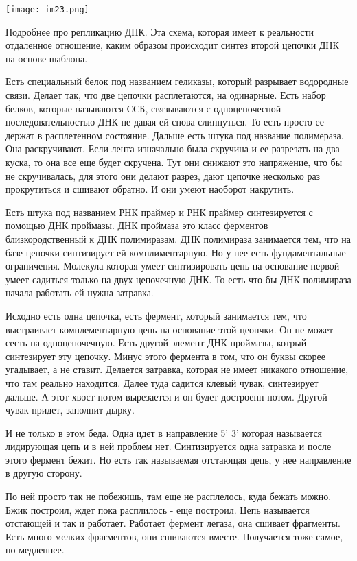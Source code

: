 \texttt{[image: im23.png]}

Подробнее про репликацию ДНК. Эта схема, которая имеет к реальности 
отдаленное отношение, каким образом происходит синтез второй цепочки ДНК на 
основе шаблона. 

Есть специальный белок под названием геликазы, который разрывает водородные связи. 
Делает так, что две цепочки расплетаются, на одинарные. Есть набор 
белков, которые называются ССБ, связываются с одноцепочесной последовательностью ДНК
не давая ей снова слипнуться. То есть просто ее держат в расплетенном состояние. 
Дальше есть штука под название полимераза.  Она раскручивают. Если лента изначально была 
скручина и ее разрезать на два куска, то она все еще будет скручена. Тут они снижают это 
напряжение, что бы не скручивалась, для этого они делают разрез, дают 
цепочке несколько раз прокрутиться и сшивают обратно. И они 
умеют наоборот накрутить. 

Есть штука под названием РНК праймер и РНК праймер синтезируется с помощью
ДНК проймазы. ДНК проймаза это класс ферментов близкородственный к ДНК 
полимиразам. ДНК полимираза занимается тем, что на базе 
цепочки синтизирует ей комплиментарную. Но у нее есть фундаментальные ограничения. 
Молекула которая умеет синтизировать цепь на основание первой умеет садиться 
только на двух цепочечную ДНК. То есть что бы ДНК полимираза начала работать 
ей нужна затравка. 

Исходно есть одна цепочка, есть фермент, который занимается тем, что выстраивает 
комплементарную цепь на основание этой цеопчки. Он не может 
сесть на одноцепочечную. Есть другой элемент ДНК проймазы, котрый 
синтезирует эту цепочку. Минус этого 
фермента в том, что он буквы скорее угадывает, а не ставит. Делается 
затравка, которая не имеет никакого отношение, что там реально находится. 
Далее туда садится клевый чувак, синтезирует дальше. А этот хвост потом вырезается и он 
будет достроенн потом. Другой чувак придет, заполнит дырку. 

И не только в этом беда. Одна идет в направление 5' 3' которая называется лидирующая цепь и 
в ней проблем нет. Синтизируется одна затравка и после этого 
фермент бежит. Но есть так называемая отстающая цепь, у нее направление в другую сторону. 

По ней просто так не побежишь, там еще не расплелось, куда бежать можно. Бжик построил, 
ждет пока расплилось - еще построил. Цепь называется отстающей и так и работает. 
Работает фермент легаза, она сшивает фрагменты. Есть много мелких фрагментов, они 
сшиваются вместе. Получается тоже самое, но медленнее. 

